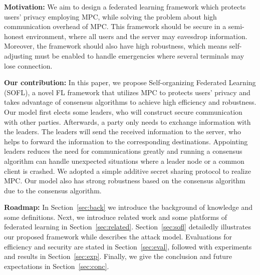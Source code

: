 \textbf{Motivation:} We aim to design a federated learning framework which protects users' privacy employing MPC, while solving the problem about high communication overhead of MPC. This framework should be secure in a semi-honest environment, where all users and the server may eavesdrop information. Moreover, the framework should also have high robustness, which means self-adjusting must be enabled to handle emergencies where several terminals may lose connection.

\textbf{Our contribution:} In this paper, we propose Self-organizing Federated Learning (SOFL), a novel FL framework that utilizes MPC to protects users' privacy and takes advantage of consensus algorithms to achieve high efficiency and robustness. Our model first elects some leaders, who will construct secure communication with other parties. Afterwards, a party only needs to exchange information with the leaders. The leaders will send the received information to the server, who helps to forward the information to the corresponding destinations. Appointing leaders reduces the need for communications greatly and running a consensus algorithm can handle unexpected situations where a leader node or a common client is crashed. We adopted a simple additive secret sharing protocol to realize MPC. Our model also has strong robustness based on the consensus algorithm due to the consensus algorithm. 

\textbf{Roadmap:} In Section~\ref{sec:back} we introduce the background of knowledge and some definitions. Next, we introduce related work and some platforms of federated learning in Section~\ref{sec:related}. Section~\ref{sec:sofl} detailedly illustrates our proposed framework while describes the attack model. Evaluations for efficiency and security are stated in Section~\ref{sec:eval}, followed with experiments and results in Section~\ref{sec:exp}. Finally, we give the conclusion and future expectations in Section~\ref{sec:conc}.